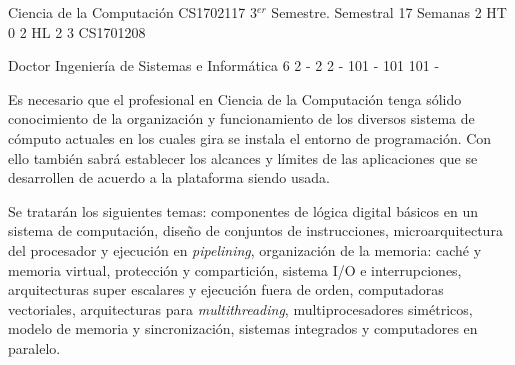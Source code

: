 \documentclass[a4paper,8pt]{article}
\begin{document}
\setNombreProfesor{}
\setGradoProfesorAbreviado{}
\sylabusHeader

\academicaTable
{Ciencia de la Computación} %
{CS1702117} %
{3$^{er}$ Semestre.} %
{Semestral} %
{17 Semanas} %
{2 HT} %
{} %
{0} %
{2 HL}  %
{2} %
{3} %
{CS1701208} %

\administrativaTable
{Doctor} %
{Ingeniería de Sistemas e Informática} %
{6} %
{2} %
{-} %
{2} %
{2} %
{-} %
{101} %
{-} %
{101} %
{101} %
{-} %


\begin{fundamentacion}
Es necesario que el profesional en Ciencia de la Computación tenga sólido  conocimiento de la organización y funcionamiento de los diversos sistema de cómputo actuales en los cuales gira se instala el entorno de programación. Con ello también sabrá establecer los alcances y límites de las aplicaciones que se desarrollen de acuerdo a la plataforma siendo usada.

Se tratarán los siguientes temas: componentes de lógica digital básicos en un sistema de computación, diseño de conjuntos de instrucciones, microarquitectura del procesador y ejecución en \textit{pipelining}, organización de la memoria: caché y memoria virtual, protección y compartición, sistema I/O e interrupciones, arquitecturas super escalares y ejecución fuera de orden, computadoras vectoriales, arquitecturas para \textit{multithreading}, multiprocesadores simétricos, modelo de memoria y sincronización, sistemas integrados y computadores en paralelo.


\end{fundamentacion}

\begin{sumilla}
\item \ARDigitallogicanddigitalsystems
\item \ARMachinelevelrepresentationofdata
\item \ARAssemblylevelmachineorganization
\item \ARFunctionalorganization
\item \ARMemorysystemorganizationandarchitecture
\item \ARInterfacingandcommunication
\item \ARMultiprocessingandalternativearchitectures
\item \ARPerformanceenhancements

\end{sumilla}
\end{document}
